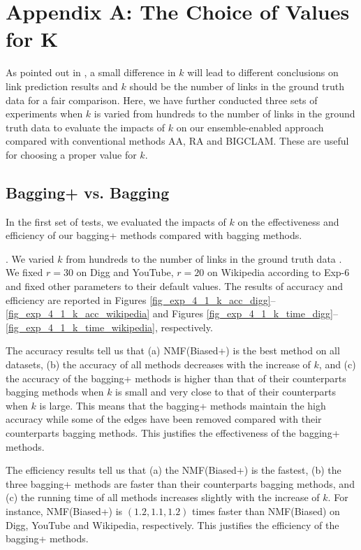 \documentclass[10pt,journal,compsoc]{IEEEtran}
\newcommand{\stitle}[1]{\vspace{0.5ex}\noindent{\bf #1}}
\newcommand{\Biased}{{\sf NMF(Biased)}\xspace}
\newcommand{\Aa}{{\sf AA}\xspace }
\newcommand{\RA}{{\sf RA}\xspace }
\newcommand{\BIGCLAM}{{\sf BIGCLAM}\xspace}
\newcommand{\Digg}{{\sf Digg}\xspace}
\newcommand{\YouTube}{{\sf YouTube}\xspace}
\newcommand{\Wikipedia}{{\sf Wikipedia}\xspace}
\newcommand{\Biasedp}{{\sf NMF(Biased+)}\xspace}
\begin{document}
\section{Appendix A: The Choice of Values for K}

 As pointed out in \cite{yang2015}, a small
difference in $k$ will lead to different conclusions on link prediction results
and $k$ should be the number of links in the ground truth data for a fair
comparison. Here, we have further conducted three sets of experiments when
$k$ is varied from hundreds to the number of links in the ground truth data to evaluate
the impacts of $k$ on our ensemble-enabled approach compared with conventional methods
\Aa, \RA and \BIGCLAM. These are useful for choosing a proper value for $k$.



\subsection{Bagging+ vs. Bagging}
In the first set of tests, we evaluated the impacts of $k$ on the
effectiveness and efficiency of our bagging+ methods compared with bagging methods.

\stitle{Exp-4.1: Impacts of $k$}. We varied $k$ from hundreds
to the number of links in the ground truth data \cite{yang2015}.
We fixed $r = 30$ on \Digg and \YouTube, $r = 20$ on \Wikipedia according to Exp-6
and fixed other parameters to their default values.
The results of accuracy and efficiency are reported
in Figures \ref{fig_exp_4_1_k_acc_digg}--\ref{fig_exp_4_1_k_acc_wikipedia} and
Figures \ref{fig_exp_4_1_k_time_digg}--\ref{fig_exp_4_1_k_time_wikipedia}, respectively.

The accuracy results tell us that
(a) \Biasedp is the best method on all datasets,
(b) the accuracy of all methods decreases with the increase of $k$,
and (c) the accuracy of the bagging+ methods is higher than that of
their counterparts bagging methods when $k$ is small and very
close to that of their counterparts when $k$ is large.
This means that the bagging+ methods maintain the high accuracy while some of the
edges have been removed compared with their counterparts bagging methods.
This justifies the effectiveness of the bagging+ methods.


The  efficiency  results tell us that (a) the \Biasedp is the fastest, (b) the three bagging+ methods are faster
than their counterparts bagging methods, and (c) the running time of all
methods increases slightly with the increase of $k$. For instance,
\Biasedp is $(1.2, 1.1, 1.2)$ times faster than
\Biased on \Digg, \YouTube and \Wikipedia, respectively.
This justifies the efficiency of the bagging+ methods.
\end{document}
